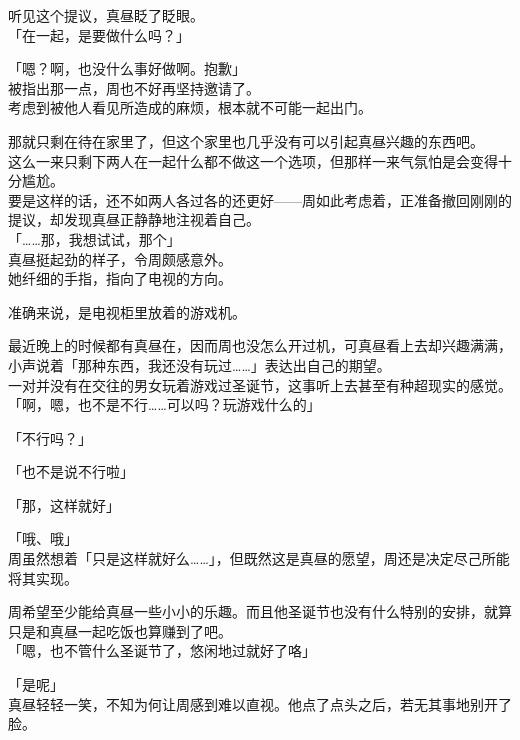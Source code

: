 听见这个提议，真昼眨了眨眼。\\

「在一起，是要做什么吗？」

「嗯？啊，也没什么事好做啊。抱歉」\\

被指出那一点，周也不好再坚持邀请了。\\

考虑到被他人看见所造成的麻烦，根本就不可能一起出门。

那就只剩在待在家里了，但这个家里也几乎没有可以引起真昼兴趣的东西吧。\\

这么一来只剩下两人在一起什么都不做这一个选项，但那样一来气氛怕是会变得十分尴尬。\\

要是这样的话，还不如两人各过各的还更好——周如此考虑着，正准备撤回刚刚的提议，却发现真昼正静静地注视着自己。\\

「……那，我想试试，那个」\\

真昼挺起劲的样子，令周颇感意外。\\

她纤细的手指，指向了电视的方向。

准确来说，是电视柜里放着的游戏机。

最近晚上的时候都有真昼在，因而周也没怎么开过机，可真昼看上去却兴趣满满，小声说着「那种东西，我还没有玩过……」表达出自己的期望。\\

一对并没有在交往的男女玩着游戏过圣诞节，这事听上去甚至有种超现实的感觉。\\

「啊，嗯，也不是不行……可以吗？玩游戏什么的」

「不行吗？」

「也不是说不行啦」

「那，这样就好」

「哦、哦」\\

周虽然想着「只是这样就好么……」，但既然这是真昼的愿望，周还是决定尽己所能将其实现。

周希望至少能给真昼一些小小的乐趣。而且他圣诞节也没有什么特别的安排，就算只是和真昼一起吃饭也算赚到了吧。\\

「嗯，也不管什么圣诞节了，悠闲地过就好了咯」

「是呢」\\

真昼轻轻一笑，不知为何让周感到难以直视。他点了点头之后，若无其事地别开了脸。
